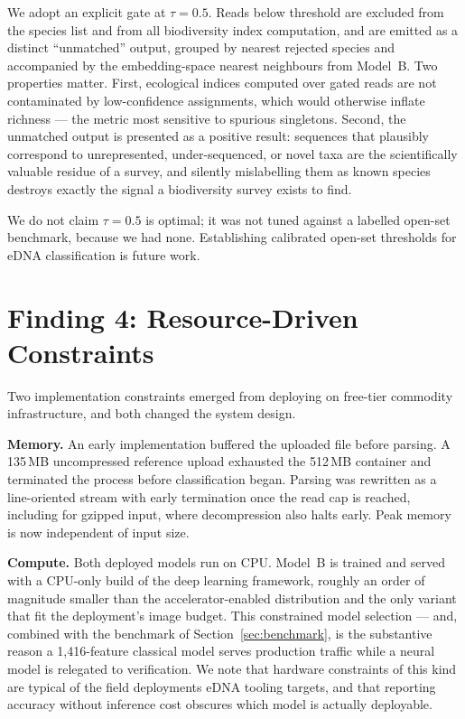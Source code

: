 \documentclass[conference]{IEEEtran}
\begin{document}
We adopt an explicit gate at $\tau=0.5$. Reads below threshold are excluded
from the species list and from all biodiversity index computation, and are
emitted as a distinct ``unmatched'' output, grouped by nearest rejected
species and accompanied by the embedding-space nearest neighbours from
Model~B. Two properties matter. First, ecological indices computed over
gated reads are not contaminated by low-confidence assignments, which would
otherwise inflate richness --- the metric most sensitive to spurious
singletons. Second, the unmatched output is presented as a positive
result: sequences that plausibly correspond to unrepresented, under-sequenced,
or novel taxa are the scientifically valuable residue of a survey, and
silently mislabelling them as known species destroys exactly the signal a
biodiversity survey exists to find.

We do not claim $\tau=0.5$ is optimal; it was not tuned against a
labelled open-set benchmark, because we had none. Establishing calibrated
open-set thresholds for eDNA classification is future work.

\section{Finding 4: Resource-Driven Constraints}
\label{sec:resource}

Two implementation constraints emerged from deploying on free-tier
commodity infrastructure, and both changed the system design.

\textbf{Memory.} An early implementation buffered the uploaded file before
parsing. A 135\,MB uncompressed reference upload exhausted the 512\,MB
container and terminated the process before classification began. Parsing
was rewritten as a line-oriented stream with early termination once the
read cap is reached, including for gzipped input, where decompression also
halts early. Peak memory is now independent of input size.

\textbf{Compute.} Both deployed models run on CPU. Model~B is trained and
served with a CPU-only build of the deep learning framework, roughly an
order of magnitude smaller than the accelerator-enabled distribution and
the only variant that fit the deployment's image budget. This constrained
model selection --- and, combined with the benchmark of
Section~\ref{sec:benchmark}, is the substantive reason a 1{,}416-feature
classical model serves production traffic while a neural model is relegated
to verification. We note that hardware constraints of this kind are typical
of the field deployments eDNA tooling targets, and that reporting accuracy
without inference cost obscures which model is actually deployable.
\end{document}
